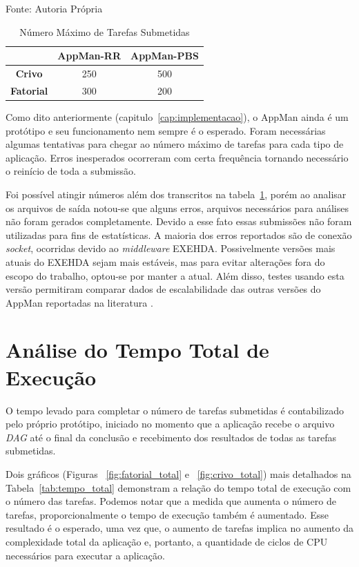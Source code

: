 \begin{table}[hbtp]
\begin{center}
\caption{Número Máximo de Tarefas Submetidas}
\begin{center}
	Fonte: Autoria Própria
\end{center}
\label{tab:num_max_tarefas}
\begin{tabular}{c|c|c}
	\hline
		& {\bf AppMan-RR} & {\bf AppMan-PBS}\\
	\hline
	{\bf Crivo} & 250 & 500\\ \hline
	\textbf{Fatorial} & 300 & 200\\ \hline
\end{tabular}
\end{center}
\end{table}

Como dito anteriormente (capitulo~\ref{cap:implementacao}), o AppMan ainda é um protótipo e seu funcionamento nem sempre é o esperado. Foram necessárias algumas tentativas para chegar ao número máximo de tarefas para cada tipo de aplicação. Erros inesperados ocorreram com certa frequência tornando necessário o reinício de toda a submissão. 

Foi possível atingir números além dos transcritos na tabela~\ref{tab:num_max_tarefas}, porém ao analisar os arquivos de saída notou-se que alguns erros, arquivos necessários para análises não foram gerados completamente. Devido a esse fato essas submissões não foram utilizadas para fins de estatísticas. A maioria dos erros reportados são de conexão \emph{socket}, ocorridas devido ao \emph{middleware} EXEHDA. Possivelmente versões mais atuais do EXEHDA sejam mais estáveis, mas para evitar alterações fora do escopo do trabalho, optou-se por manter a atual. Além disso, testes usando esta versão permitiram comparar dados de escalabilidade das outras versões do AppMan reportadas na literatura \cite{Mangan2006}.

\section{Análise do Tempo Total de Execução}

O tempo levado para completar o número de tarefas submetidas é contabilizado pelo próprio protótipo, iniciado no momento que a aplicação recebe o arquivo \emph{DAG} até o final da conclusão e recebimento dos resultados de todas as tarefas submetidas. 

Dois gráficos (Figuras ~\ref{fig:fatorial_total} e ~\ref{fig:crivo_total}) mais detalhados na Tabela~\ref{tab:tempo_total} demonstram a relação do tempo total de execução com o número das tarefas. Podemos notar que a medida que aumenta o número de tarefas, proporcionalmente o tempo de execução também é aumentado. Esse resultado é o esperado, uma vez que, o aumento de tarefas implica no aumento da complexidade total da aplicação e, portanto, a quantidade de ciclos de CPU necessários para executar a aplicação.

